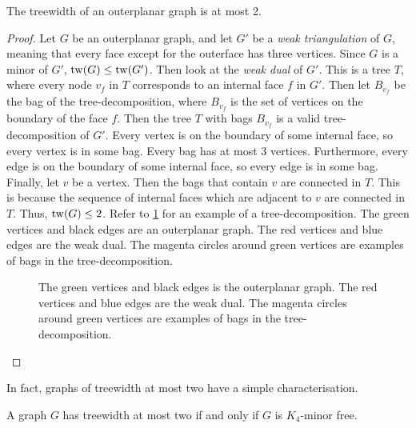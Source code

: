 \begin{proposition}\label{ex:tw_outerplanar}
	The treewidth of an outerplanar graph is at most 2.
\end{proposition}
\begin{proof}
	Let \(G\) be an outerplanar graph, and let \(G'\) be a \textit{weak triangulation} of \(G\), meaning that every face except for the outerface has three vertices. Since \(G\) is a minor of \(G'\), \(\operatorname{tw}(G) \leq \operatorname{tw}(G')\). Then look at the \textit{weak dual} of \(G'\). This is a tree \(T\), where every node \(v_f\) in \(T\) corresponds to an internal face \(f\) in \(G'\). Then let \(B_{v_f}\) be the bag of the tree-decomposition, where \(B_{v_f}\) is the set of vertices on the boundary of the face \(f\). Then the tree \(T\) with bags \(B_{v_f}\) is a valid tree-decomposition of \(G'\). Every vertex is on the boundary of some internal face, so every vertex is in some bag. Every bag has at most 3 vertices. Furthermore, every edge is on the boundary of some internal face, so every edge is in some bag. Finally, let $v$ be a vertex. Then the bags that contain $v$ are connected in $T$. This is because the sequence of internal faces which are adjacent to $v$ are connected in $T$. Thus, \(\operatorname{tw}(G) \leq 2\). Refer to \cref{fig:outerplanar_treedecomp} for an example of a tree-decomposition. The green vertices and black edges are an outerplanar graph. The red vertices and blue edges are the weak dual. The magenta circles around green vertices are examples of bags in the tree-decomposition.
	\begin{figure}[h!]
		\centering
		
		\caption[Tree-decomposition of outerplanar graph.]{ The green vertices and black edges is the outerplanar graph. The red vertices and blue edges are the weak dual. The magenta circles around green vertices are examples of bags in the tree-decomposition.}\label{fig:outerplanar_treedecomp}
	\end{figure}
\end{proof}

In fact, graphs of treewidth at most two have a simple characterisation.

\begin{proposition}\label{prop:k4-minor}
	A graph $G$ has treewidth at most two if and only if $G$ is $K_4$-minor free. 
\end{proposition}

